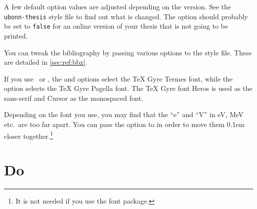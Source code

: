 A few default option values are adjusted depending on the \TeXLive version.
See the \texttt{ubonn-thesis} style file to find out what is changed.
The option  should probably be set to \texttt{false} for an online version of your thesis
that is not going to be printed.

You can tweak the bibliography by passing various options to the
 style file.
These are detailed in \cref{sec:ref:bbx}.

If you use \LuaLaTeX\ or \XeLaTeX,
the  and  options select the TeX Gyre Termes font,
while the  option selects the TeX Gyre Pagella font.
The TeX Gyre font Heros is used as the sans-serif and Cursor as the monospaced font.

Depending on the font you use, you may find that the \enquote{e} and \enquote{V} in \si{\eV}, \si{\MeV} etc.\
are too far apart.
You can pass the option  to  in order to move them 0.1em closer together.\footnote{%
It is not needed if you use the \Package{newtx} font package.}


\section{Do}%
\label{sec:tips:do}

